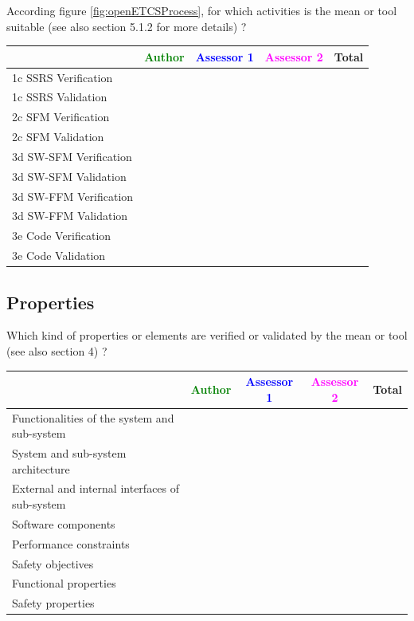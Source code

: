 According figure \ref{fig:openETCSProcess}, for which activities is the mean or tool suitable (see also \citep{D4.1} section 5.1.2 for more details) ?


\begin{tabular}{|l | c | c | c | c|}
\hline
& \textcolor{green}{Author} & \textcolor{blue}{Assessor 1} & \textcolor{magenta}{Assessor 2} & Total \\
\hline 
1c SSRS Verification & & & &  \\
\hline
1c SSRS Validation & & & &  \\
\hline
2c SFM Verification & & & &  \\
\hline
2c SFM Validation & & & &  \\
\hline
3d SW-SFM Verification & & & &  \\
\hline
3d SW-SFM Validation & & & &  \\
\hline
3d SW-FFM Verification & & & &  \\
\hline
3d SW-FFM Validation & & & &  \\
\hline
3e Code Verification & & & &  \\
\hline
3e Code Validation & & & &  \\
\hline
\end{tabular}


\subsection{Properties}

Which kind of properties or elements are verified or validated by the mean or tool (see also \citep{D4.1} section 4)  ?



\begin{tabular}{|l | c | c | c | c|}
\hline
& \textcolor{green}{Author} & \textcolor{blue}{Assessor 1} & \textcolor{magenta}{Assessor 2} & Total \\
\hline 
Functionalities of the system and sub-system & & & &  \\
\hline
System and sub-system architecture & & & &  \\
\hline
External and internal interfaces of sub-system & & & &  \\
\hline
Software components & & & &  \\
\hline
Performance constraints & & & &  \\
\hline
Safety objectives & & & &  \\
\hline
Functional properties & & & &  \\
\hline
Safety properties & & & &  \\
\hline
\end{tabular}




